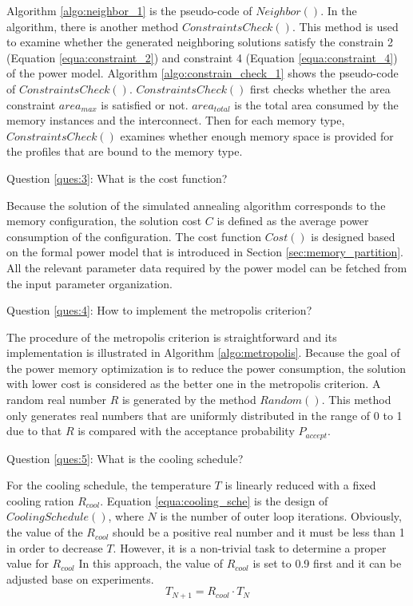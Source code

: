 		Algorithm \ref{algo:neighbor_1} is the pseudo-code of $Neighbor()$.
		In the algorithm, there is another method $ConstraintsCheck()$.
		This method is used to examine whether the generated neighboring solutions satisfy the
		constrain 2 (Equation \ref{equa:constraint_2}) and constraint 4
		(Equation \ref{equa:constraint_4}) of the power model.
		Algorithm \ref{algo:constrain_check_1} shows the pseudo-code of $ConstraintsCheck()$.
		$ConstraintsCheck()$ first checks whether the area constraint $area_{max}$ is satisfied
		or not.
		$area_{total}$ is the total area consumed by the memory instances and the interconnect.
		Then for each memory type, $ConstraintsCheck()$ examines whether enough memory space is
		provided for the profiles that are bound to the memory type.
		
		

		Question \ref{ques:3}: What is the cost function?
		
		Because the solution of the simulated annealing algorithm corresponds to the
		memory configuration, the solution cost $C$ is defined as the average power
		consumption of the configuration. The cost function $Cost()$ is designed
		based on the formal power model that is introduced in Section
		\ref{sec:memory_partition}. All the relevant parameter data required by the
		power model can be fetched from the input parameter organization.
	
		Question \ref{ques:4}: How to implement the metropolis criterion?
	
		The procedure of the metropolis criterion is straightforward and its
		implementation is illustrated in Algorithm \ref{algo:metropolis}.
		Because the goal of the power memory optimization is to reduce the
		power consumption, the solution with lower cost is considered as the
		better one in the metropolis criterion.
		A random real number $R$ is generated by the method $Random()$.
		This method only generates real numbers that are uniformly distributed in the
		range of 0 to 1 due to that $R$ is compared with the acceptance probability
		$P_{accept}$.
	
		
	
		Question \ref{ques:5}: What is the cooling schedule?
		
		For the cooling schedule, the temperature $T$ is linearly reduced with a fixed
		cooling ration $R_{cool}$.
		Equation \ref{equa:cooling_sche} is the design of $CoolingSchedule()$, where
		$N$ is the number of outer loop iterations.
		Obviously, the value of the $R_{cool}$ should be a positive real number and
		it must be less than 1 in order to decrease $T$.
		However, it is a non-trivial task to determine a proper value for $R_{cool}$
		In this approach, the value of $R_{cool}$ is set to 0.9 first and it can be
		adjusted base on experiments.
		\begin{equation}
		\label{equa:cooling_sche}
			T_{N+1}=R_{cool} \cdot T_{N}
		\end{equation}
		
